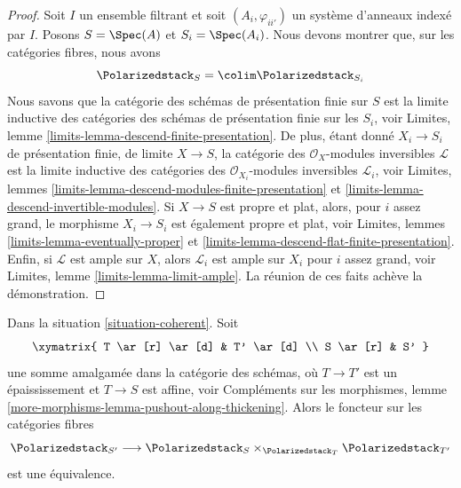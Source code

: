 \begin{proof}
Soit $I$ un ensemble filtrant et soit $(A_i, \varphi_{ii'})$ un système
d'anneaux indexé par $I$. Posons $S = \Spec(A)$ et $S_i = \Spec(A_i)$.
Nous devons montrer que, sur les catégories fibres, nous avons
$$
\Polarizedstack_S = \colim \Polarizedstack_{S_i}
$$
Nous savons que la catégorie des schémas de présentation finie sur $S$ est la
limite inductive des catégories des schémas de présentation finie sur les
$S_i$, voir
Limites, lemme \ref{limits-lemma-descend-finite-presentation}.
De plus, étant donné $X_i \to S_i$ de présentation finie, de limite
$X \to S$, la catégorie des $\mathcal{O}_X$-modules inversibles
$\mathcal{L}$ est la limite inductive des catégories des
$\mathcal{O}_{X_i}$-modules inversibles $\mathcal{L}_i$, voir
Limites, lemmes \ref{limits-lemma-descend-modules-finite-presentation} et
\ref{limits-lemma-descend-invertible-modules}.
Si $X \to S$ est propre et plat, alors, pour $i$ assez grand, le morphisme
$X_i \to S_i$ est également propre et plat, voir
Limites, lemmes \ref{limits-lemma-eventually-proper} et
\ref{limits-lemma-descend-flat-finite-presentation}.
Enfin, si $\mathcal{L}$ est ample sur $X$, alors $\mathcal{L}_i$ est ample sur
$X_i$ pour $i$ assez grand, voir
Limites, lemme \ref{limits-lemma-limit-ample}.
La réunion de ces faits achève la démonstration.
\end{proof}

\begin{lemma}
\label{lemma-polarized-RS-star}
Dans la situation \ref{situation-coherent}. Soit
$$
\xymatrix{
T \ar[r] \ar[d] & T' \ar[d] \\
S \ar[r] & S'
}
$$
une somme amalgamée dans la catégorie des schémas, où
$T \to T'$ est un épaississement et $T \to S$ est affine, voir
Compléments sur les morphismes, lemme
\ref{more-morphisms-lemma-pushout-along-thickening}.
Alors le foncteur sur les catégories fibres
$$
\Polarizedstack_{S'}
\longrightarrow
\Polarizedstack_S \times_{\Polarizedstack_T} \Polarizedstack_{T'}
$$
est une équivalence.
\end{lemma}

